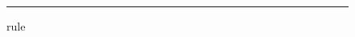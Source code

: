 \documentclass{memoir}
\begin{document}
\begin{figure}[t]\hrule width 1in height 1in\caption{rule}\end{figure}%
\lipsum[1]\leavevmode{}%
\lipsum[2]%
%
\lipsum[3-9]%
\end{document}
